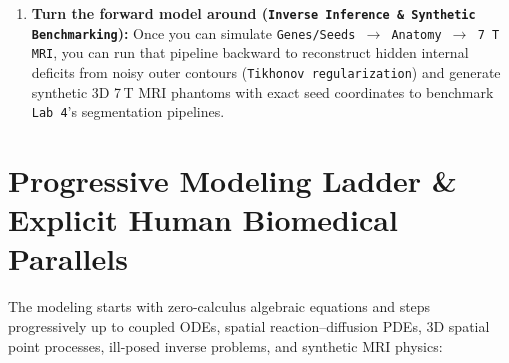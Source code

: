 \documentclass[10pt,a4paper]{article}
\begin{document}
\begin{enumerate}
    \item \textbf{Turn the forward model around (\texttt{Inverse Inference \& Synthetic Benchmarking}):} Once you can simulate \texttt{Genes/Seeds $\to$ Anatomy $\to$ 7\,T MRI}, you can run that pipeline backward to reconstruct hidden internal deficits from noisy outer contours (\texttt{Tikhonov regularization}) and generate synthetic 3D 7\,T MRI phantoms with exact seed coordinates to benchmark \texttt{Lab 4}'s segmentation pipelines.
\end{enumerate}

\section{Progressive Modeling Ladder \& Explicit Human Biomedical Parallels}

The modeling starts with zero-calculus algebraic equations and steps progressively up to coupled ODEs, spatial reaction--diffusion PDEs, 3D spatial point processes, ill-posed inverse problems, and synthetic MRI physics:
\end{document}
